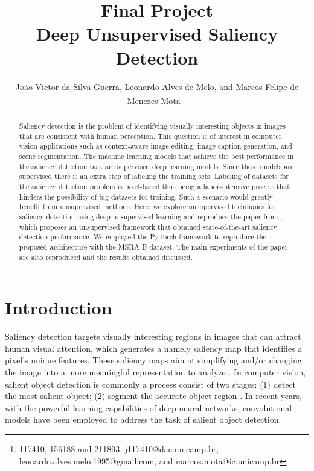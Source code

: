\documentclass{article}
\begin{document}
\title{Final Project \\
\large Deep Unsupervised Saliency Detection}
\author{
Jo\~ao Victor da Silva Guerra,
Leonardo Alves de Melo,
and Marcos Felipe de Menezes Mota
\thanks{117410, 156188 and 211893. j117410@dac.unicamp.br, leonardo.alves.melo.1995@gmail.com, and marcos.mota@ic.unicamp.br}
}

\maketitle

\begin{abstract}

Saliency detection is the problem of identifying visually interesting objects in images that are consistent with human perception. This question is of interest in computer vision applications such as context-aware image editing, image caption generation, and scene segmentation. The machine learning models that achieve the best performance in the saliency detection task are supervised deep learning models. Since these models are supervised there is an extra step of labeling the training sets. Labeling of datasets for the saliency detection problem is pixel-based thus being a labor-intensive process that hinders the possibility of big datasets for training. Such a scenario would greatly benefit from unsupervised methods. Here, we explore unsupervised techniques for saliency detection using deep unsupervised learning and reproduce the paper from \cite{zhang2018}, which proposes an unsupervised framework that obtained state-of-the-art saliency detection performance. We employed the PyTorch framework to reproduce the proposed architecture with the MSRA-B dataset. The main experiments of the paper are also reproduced and the results obtained discussed.   

\end{abstract}

\section{Introduction}

Saliency detection targets visually interesting regions in images that can attract human visual attention, which generates a namely saliency map that identifies a pixel's unique features. These saliency maps aim at simplifying and/or changing the image into a more meaningful representation to analyze \cite{zhang2018, symonyan2014}. In computer vision, salient object detection is commonly a process consist of two stages: (1) detect the most salient object; (2) segment the accurate object region \cite{zhang2014}. In recent years, with the powerful learning capabilities of deep neural networks, convolutional models have been employed to address the task of salient object detection.
\end{document}
